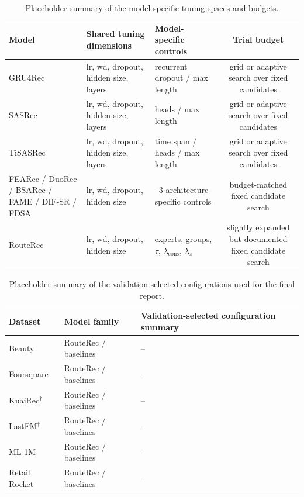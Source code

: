\documentclass[sigconf,review,anonymous]{acmart}
\begin{document}
\begin{table}[t]
  \centering
  \caption{Placeholder summary of the model-specific tuning spaces and budgets.}
  \label{tab:appendix-tuning-space}
  \scriptsize
  \setlength{\tabcolsep}{4pt}
  \begin{tabularx}{\columnwidth}{@{}lX>{\raggedright\arraybackslash}Xc@{}}
    \toprule
    Model & Shared tuning dimensions & Model-specific controls & Trial budget \\
    \midrule
    GRU4Rec & lr, wd, dropout, hidden size, layers & recurrent dropout / max length & grid or adaptive search over fixed candidates \\
    SASRec & lr, wd, dropout, hidden size, layers & heads / max length & grid or adaptive search over fixed candidates \\
    TiSASRec & lr, wd, dropout, hidden size, layers & time span / heads / max length & grid or adaptive search over fixed candidates \\
    FEARec / DuoRec / BSARec / FAME / DIF-SR / FDSA & lr, wd, dropout, hidden size & 1--3 architecture-specific controls & budget-matched fixed candidate search \\
    RouteRec & lr, wd, dropout, hidden size & experts, groups, $\tau$, $\lambda_{\mathrm{cons}}$, $\lambda_z$ & slightly expanded but documented fixed candidate search \\
    \bottomrule
  \end{tabularx}
\end{table}

\begin{table}[t]
  \centering
  \caption{Placeholder summary of the validation-selected configurations used for the final report.}
  \label{tab:appendix-selected-configs}
  \scriptsize
  \setlength{\tabcolsep}{4pt}
  \begin{tabularx}{\textwidth}{@{}llX@{}}
    \toprule
    Dataset & Model family & Validation-selected configuration summary \\
    \midrule
    Beauty & RouteRec / baselines & -- \\
    Foursquare & RouteRec / baselines & -- \\
    KuaiRec$^\dagger$ & RouteRec / baselines & -- \\
    LastFM$^\dagger$ & RouteRec / baselines & -- \\
    ML-1M & RouteRec / baselines & -- \\
    Retail Rocket & RouteRec / baselines & -- \\
    \bottomrule
  \end{tabularx}
\end{table}
\end{document}
